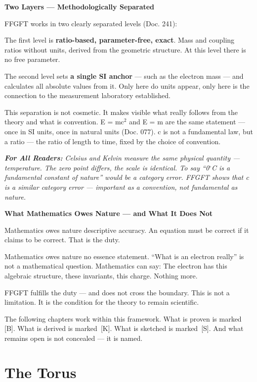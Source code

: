 \documentclass[11pt,oneside]{book}
\newcommand{\status}[1]{\penalty10000\,{\scriptsize\textcolor{gray!60}{[#1]}}}
\newenvironment{laierspur}{%
  \par\vspace{4pt}%
  \noindent\small\itshape\color{blue!60!black}%
  \textbf{For All Readers:}\enspace\ignorespaces}{%
  \par\vspace{4pt}\normalsize\normalfont\normalcolor}
\begin{document}
\textbf{Two Layers — Methodologically Separated}

FFGFT works in two clearly separated levels (Doc. 241):

The first level is \textbf{ratio-based, parameter-free, exact}. Mass and
coupling ratios without units, derived from the geometric structure. At this
level there is no free parameter.

The second level sets \textbf{a single SI anchor} — such as the electron mass
— and calculates all absolute values from it. Only here do units appear,
only here is the connection to the measurement laboratory established.

This separation is not cosmetic. It makes visible what really follows from
the theory and what is convention. E = mc$^2$ and E = m are the same
statement — once in SI units, once in natural units (Doc. 077). c is not a
fundamental law, but a ratio — the ratio of length to time, fixed by the
choice of convention.

\begin{laierspur}
Celsius and Kelvin measure the same physical quantity — temperature. The
zero point differs, the scale is identical. To say \enquote{0$^\circ$C is a fundamental
constant of nature} would be a category error. FFGFT shows that c is a
similar category error — important as a convention, not fundamental as
nature.
\end{laierspur}

\textbf{What Mathematics Owes Nature — and What It Does Not}

Mathematics owes nature descriptive accuracy. An equation must be correct if
it claims to be correct. That is the duty.

Mathematics owes nature no essence statement. \enquote{What is an electron really}
is not a mathematical question. Mathematics can say: The electron has this
algebraic structure, these invariants, this charge. Nothing more.

FFGFT fulfills the duty — and does not cross the boundary. This is not a
limitation. It is the condition for the theory to remain scientific.

The following chapters work within this framework. What is proven is marked
\status{B}. What is derived is marked \status{K}. What is sketched is marked
\status{S}. And what remains open is not concealed — it is named.


\chapter{The Torus}
\end{document}
